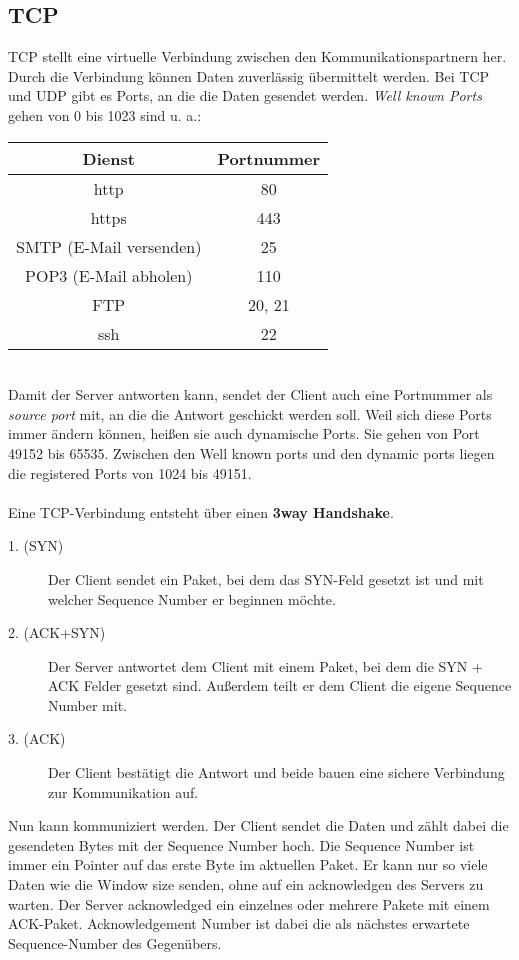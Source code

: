 \documentclass[a4paper,10pt]{scrartcl}
\begin{document}
    \subsection{TCP}
        TCP stellt eine virtuelle Verbindung zwischen den Kommunikationspartnern her. Durch die Verbindung können Daten zuverlässig übermittelt werden. Bei TCP und UDP gibt es Ports, an die die Daten gesendet werden. \emph{Well known Ports} gehen von 0 bis 1023 sind u. a.:\\
        \begin{tabular}{|c|c|}
            \hline
            Dienst & Portnummer \\
            \hline
            http & 80 \\
            https & 443 \\
            SMTP (E-Mail versenden) & 25\\
            POP3 (E-Mail abholen) & 110\\
            FTP & 20, 21 \\
            ssh & 22 \\
            \hline
        \end{tabular}  \\ 
        Damit der Server antworten kann, sendet der Client auch eine Portnummer als \emph{source port} mit, an die die Antwort geschickt werden soll. Weil sich diese Ports immer ändern können, heißen sie auch dynamische Ports. Sie gehen von Port 49152 bis 65535. Zwischen den Well known ports und den dynamic ports liegen die registered Ports von 1024 bis 49151.\\ \\
        Eine TCP-Verbindung entsteht über einen \textbf{3way Handshake}.
        \begin{description}
        \item[1. (SYN)] Der Client sendet ein Paket, bei dem das SYN-Feld gesetzt ist und mit welcher Sequence Number er beginnen möchte.
        \item[2. (ACK+SYN)] Der Server antwortet dem Client mit einem Paket, bei dem die SYN + ACK Felder gesetzt sind. Außerdem teilt er dem Client die eigene Sequence Number mit.
        \item[3. (ACK)] Der Client bestätigt die Antwort und beide bauen eine sichere Verbindung zur Kommunikation auf.
        \end{description}
        Nun kann kommuniziert werden. Der Client sendet die Daten und zählt dabei die gesendeten Bytes mit der Sequence Number hoch. Die Sequence Number ist immer ein Pointer auf das erste Byte im aktuellen Paket. Er kann nur so viele Daten wie die Window size senden, ohne auf ein acknowledgen des Servers zu warten. Der Server acknowledged ein einzelnes oder mehrere Pakete mit einem ACK-Paket. Acknowledgement Number ist dabei die als nächstes erwartete Sequence-Number des Gegenübers.\\
\end{document}
